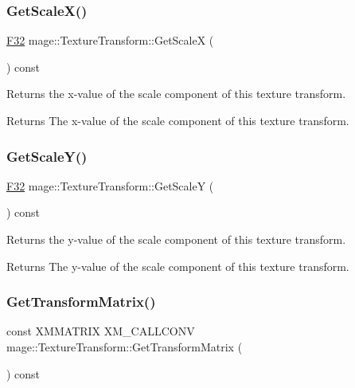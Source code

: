 \subsubsection{\texorpdfstring{Get\+Scale\+X()}{GetScaleX()}}
{\footnotesize\ttfamily \hyperlink{namespacemage_aa97e833b45f06d60a0a9c4fc22ae02c0}{F32} mage\+::\+Texture\+Transform\+::\+Get\+ScaleX (\begin{DoxyParamCaption}{ }\end{DoxyParamCaption}) const\hspace{0.3cm}{\ttfamily [noexcept]}}

Returns the x-\/value of the scale component of this texture transform.

\begin{DoxyReturn}{Returns}
The x-\/value of the scale component of this texture transform. 
\end{DoxyReturn}
\hypertarget{classmage_1_1_texture_transform_a06a3314cef041f0070f7203e1538a2eb}{}\label{classmage_1_1_texture_transform_a06a3314cef041f0070f7203e1538a2eb} 
\subsubsection{\texorpdfstring{Get\+Scale\+Y()}{GetScaleY()}}
{\footnotesize\ttfamily \hyperlink{namespacemage_aa97e833b45f06d60a0a9c4fc22ae02c0}{F32} mage\+::\+Texture\+Transform\+::\+Get\+ScaleY (\begin{DoxyParamCaption}{ }\end{DoxyParamCaption}) const\hspace{0.3cm}{\ttfamily [noexcept]}}

Returns the y-\/value of the scale component of this texture transform.

\begin{DoxyReturn}{Returns}
The y-\/value of the scale component of this texture transform. 
\end{DoxyReturn}
\hypertarget{classmage_1_1_texture_transform_a8463a5d1060614cd3a8847b527094fc0}{}\label{classmage_1_1_texture_transform_a8463a5d1060614cd3a8847b527094fc0} 
\subsubsection{\texorpdfstring{Get\+Transform\+Matrix()}{GetTransformMatrix()}}
{\footnotesize\ttfamily const X\+M\+M\+A\+T\+R\+IX X\+M\+\_\+\+C\+A\+L\+L\+C\+O\+NV mage\+::\+Texture\+Transform\+::\+Get\+Transform\+Matrix (\begin{DoxyParamCaption}{ }\end{DoxyParamCaption}) const\hspace{0.3cm}{\ttfamily [noexcept]}}

